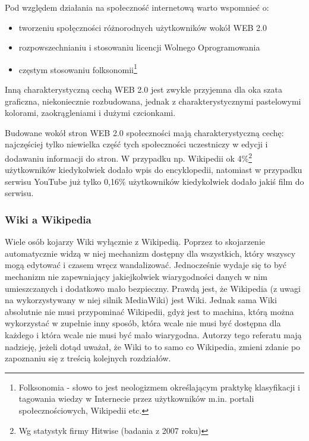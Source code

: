 \documentclass{article}
\begin{document}
		Pod względem działania na społeczność internetową warto wspomnieć o:
		\begin{itemize}
    		\item tworzeniu społęczności różnorodnych użytkowników wokół WEB 2.0
			\item rozpowszechnianiu i stosowaniu licencji Wolnego Oprogramowania
			\item częstym stosowaniu folksonomii\footnote{Folksonomia - słowo to jest neologizmem określającym praktykę klasyfikacji i tagowania wiedzy w Internecie przez użytkowników m.in. portali społecznościowych, Wikipedii etc.}
		\end{itemize}


		Inną charakterystyczną cechą WEB 2.0 jest zwykle przyjemna dla oka szata graficzna, niekoniecznie rozbudowana, jednak z charakterystycznymi pastelowymi kolorami, zaokrągleniami i dużymi czcionkami.

	
		Budowane wokół stron WEB 2.0 społeczności mają charakterystyczną cechę: najczęściej tylko niewielka część tych społeczności uczestniczy w edycji i dodawaniu informacji do stron. W przypadku np. Wikipedii ok 4\%\footnote{Wg statystyk firmy Hitwise (badania z 2007 roku)} użytkowników kiedykolwiek dodało wpis do encyklopedii, natomiast w przypadku serwisu YouTube już tylko 0,16\% użytkowników kiedykolwiek dodało jakiś film do serwisu. 		






	\subsubsection{Wiki a Wikipedia}
	Wiele osób kojarzy Wiki wyłącznie z Wikipedią. Poprzez to skojarzenie automatycznie widzą w niej mechanizm dostępny dla wszystkich, który wszyscy mogą edytować i czasem wręcz wandalizować. Jednocześnie wydaje się to być mechanizm nie zapewniający jakiejkolwiek wiarygodności danych w nim umieszczanych i dodatkowo mało bezpieczny. Prawdą jest, że Wikipedia (z uwagi na wykorzystywany w niej silnik MediaWiki) jest Wiki. Jednak sama Wiki absolutnie nie musi przypominać Wikipedii, gdyż jest to machina, którą można wykorzystać w zupełnie inny sposób, która wcale nie musi być dostępna dla każdego i która wcale nie musi być mało wiarygodna. Autorzy tego referatu mają nadzieję, jeżeli dotąd uważał, że Wiki to to samo co Wikipedia, zmieni zdanie po zapoznaniu się z treścią kolejnych rozdziałów.
\end{document}
